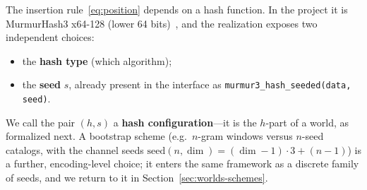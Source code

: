 \documentclass[11pt,a4paper]{article}
\theoremstyle{remark}
\begin{document}
The insertion rule~\eqref{eq:position} depends on a hash function. In the
project it is MurmurHash3 x64-128 (lower 64 bits)~\cite{murmur3}, and the
realization exposes two independent choices:
\begin{itemize}[leftmargin=*,nosep]
  \item the \textbf{hash type} (which algorithm);
  \item the \textbf{seed} $s$, already present in the interface as
    \texttt{murmur3\_hash\_seeded(data, seed)}.
\end{itemize}
We call the pair $(h,s)$ a \textbf{hash configuration}---it is the $h$-part of a
world, as formalized next. A bootstrap scheme
(e.g.\ $n$-gram windows versus $n$-seed catalogs, with the channel seeds
$\mathrm{seed}(n,\dim)=(\dim-1)\cdot 3+(n-1)$) is a further, encoding-level
choice; it enters the same framework as a discrete family of seeds, and we
return to it in Section~\ref{sec:worlds-schemes}.
\end{document}
